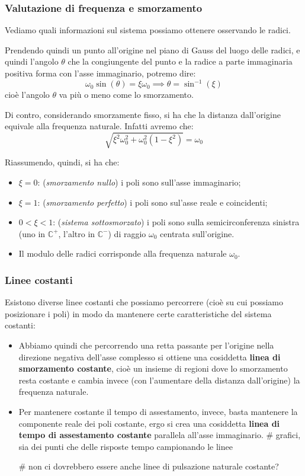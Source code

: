 \documentclass[a4paper,11pt]{article}
\begin{document}
\subsubsection{Valutazione di frequenza e smorzamento}

Vediamo quali informazioni sul sistema possiamo ottenere osservando le radici.

Prendendo quindi un punto all'origine nel piano di Gauss del luogo delle radici, e quindi l'angolo $\theta$ che la congiungente del punto e la radice a parte immaginaria positiva forma con l'asse immaginario, potremo dire:
$$
\omega_0 \sin(\theta) = \xi \omega_0 \implies \theta = \sin^{-1} (\xi) 
$$
cioè l'angolo $\theta$ va più o meno come lo smorzamento.

Di contro, considerando smorzamente fisso, si ha che la distanza dall'origine equivale alla frequenza naturale.
Infatti avremo che:
$$
\sqrt{ \xi^2 \omega_0^2 + \omega_0^2 (1 - \xi^2) } = \omega_0
$$

Riassumendo, quindi, si ha che:
\begin{itemize}
	\item $\xi = 0$: (\textit{smorzamento nullo}) i poli sono sull'asse immaginario;
	\item $\xi = 1$: (\textit{smorzamento perfetto})  i poli sono sul'asse reale e coincidenti;
	\item $0 < \xi < 1$: (\textit{sistema sottosmorzato}) i poli sono sulla semicirconferenza sinistra (uno in $\mathbb{C}^+$, l'altro in $\mathbb{C}^-$) di raggio $\omega_0$ centrata sull'origine.
	\item Il modulo delle radici corrisponde alla frequenza naturale $\omega_0$.
\end{itemize}

\subsubsection{Linee costanti}
Esistono diverse linee costanti che possiamo percorrere (cioè su cui possiamo posizionare i poli) in modo da mantenere certe caratteristiche del sistema costanti:
\begin{itemize}
	\item 
		Abbiamo quindi che percorrendo una retta passante per l'origine nella direzione negativa dell'asse complesso si ottiene una cosiddetta \textbf{linea di smorzamento costante}, cioè un insieme di regioni dove lo smorzamento resta costante e cambia invece (con l'aumentare della distanza dall'origine) la frequenza naturale. 
	\item
		Per mantenere costante il tempo di assestamento, invece, basta mantenere la componente reale dei poli costante, ergo si crea una cosiddetta \textbf{linea di tempo di assestamento costante} parallela all'asse immaginario. # grafici, sia dei punti che delle risposte tempo campionando le linee

		# non ci dovrebbero essere anche linee di pulsazione naturale costante?
\end{itemize}
\end{document}
